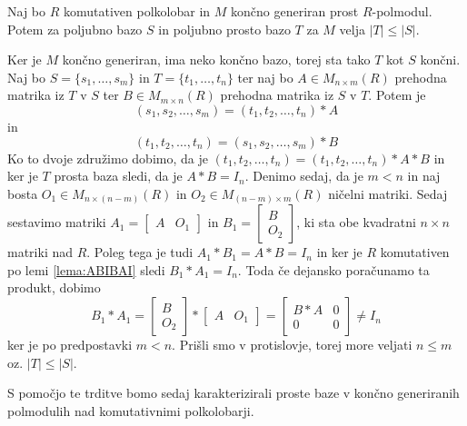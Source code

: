 \documentclass[mat1]{fmfdelo}
\newcommand{\abs}[1]{\ensuremath{\lvert #1 \rvert}}
\begin{document}
\begin{trditev}\label{trd:kardprostvsneprostbaz}
	Naj bo $R$ komutativen polkolobar in $M$ končno generiran prost $R$-polmodul. Potem za poljubno bazo $S$ in poljubno prosto bazo $T$ za $M$ velja $\abs{T}\leq\abs{S}$.
\end{trditev}

\begin{dokaz}
	Ker je $M$ končno generiran, ima neko končno bazo, torej sta tako $T$ kot $S$ končni. Naj bo $S = \{s_1,\ldots, s_m\}$ in $T =\{t_1, \ldots, t_n\}$ ter naj bo $A \in M_{n\times m}(R)$ prehodna matrika iz $T$ v $S$ ter $B\in M_{m\times n}(R)$ prehodna matrika iz $S$ v $T$. Potem je $$(s_1, s_2, \ldots, s_m) = (t_1, t_2, \ldots, t_n)*A$$ in $$(t_1, t_2, \ldots, t_n) = (s_1, s_2, \ldots, s_m)*B$$ Ko to dvoje združimo dobimo, da je $(t_1, t_2, \ldots, t_n) = (t_1, t_2, \ldots, t_n)*A*B$ in ker je $T$ prosta baza sledi, da je $A*B = I_n$. Denimo sedaj, da je $m < n$ in naj bosta $O_1\in M_{n\times (n-m)}(R)$ in $O_2\in M_{(n-m)\times m}(R)$ ničelni matriki. Sedaj sestavimo matriki $A_1 = \begin{bmatrix}
A & O_1
\end{bmatrix}$ in $B_1 = \begin{bmatrix}
B \\
 O_2
\end{bmatrix}$, ki sta obe kvadratni $n\times n$ matriki nad $R$. Poleg tega je tudi $A_1*B_1 = A*B = I_n$ in ker je $R$ komutativen po lemi \ref{lema:ABIBAI} sledi $B_1*A_1 = I_n$. Toda če dejansko poračunamo ta produkt, dobimo $$B_1*A_1 = \begin{bmatrix}
B \\
O_2
\end{bmatrix} * \begin{bmatrix}
A & O_1
\end{bmatrix} = \begin{bmatrix}
B*A & 0 \\
0 & 0
\end{bmatrix} \neq I_n$$ ker je po predpostavki $m < n$. Prišli smo v protislovje, torej more veljati $n \leq m$ oz. $\abs{T} \leq \abs{S}$.
\end{dokaz}

S pomočjo te trditve bomo sedaj karakterizirali proste baze v končno generiranih polmodulih nad komutativnimi polkolobarji.
\end{document}
